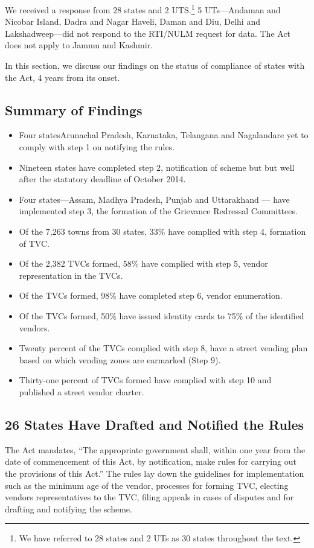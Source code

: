 \documentclass[a4paper, 12pt, twoside]{article}
\begin{document}
	We received a response from 28 states and 2 UTS.\footnote{ We have referred to 28 states and 2 UTs as 30 states throughout the text.} 5 UTs—Andaman and Nicobar Island, Dadra and Nagar Haveli, Daman and Diu, Delhi and Lakshadweep—did not respond to the RTI/NULM request for data. The Act does not apply to Jammu and Kashmir.

	In this section, we discuss our findings on the status of compliance of states with the Act, 4 years from its onset.

\subsection*{Summary of Findings}

\begin{itemize}
	\item Four states\textemdash Arunachal Pradesh, Karnataka, Telangana and Nagaland\textemdash are yet to comply with step 1 on notifying the rules.
	\item Nineteen states have completed step 2, notification of scheme but but well after the statutory deadline of October 2014.
	\item Four states---Assam, Madhya Pradesh, Punjab and Uttarakhand --- have implemented step 3, the formation of the Grievance Redressal Committees.
	\item Of the 7,263 towns from 30 states, 33\% have complied with step 4, formation of TVC.
	\item Of the 2,382 TVCs formed, 58\% have complied with step 5, vendor representation in the TVCs.
	\item Of the TVCs formed, 98\% have completed step 6, vendor enumeration.
	\item Of the TVCs formed, 50\% have issued identity cards to 75\% of the identified vendors.
	\item Twenty percent of the TVCs complied with step 8, have a street vending plan based on which vending zones are earmarked (Step 9).
	\item Thirty-one percent of TVCs formed have complied with step 10 and published a street vendor charter.
\end{itemize}

\subsection*{26 States Have Drafted and Notified the Rules}
	The Act mandates, “The appropriate government shall, within one year from the date of commencement of this Act, by notification, make rules for carrying out the provisions of this Act.” The rules lay down the guidelines for implementation such as the minimum age of the vendor, processes for forming TVC, electing vendors representatives to the TVC, filing appeals in cases of disputes and for drafting and notifying the scheme.
\end{document}
